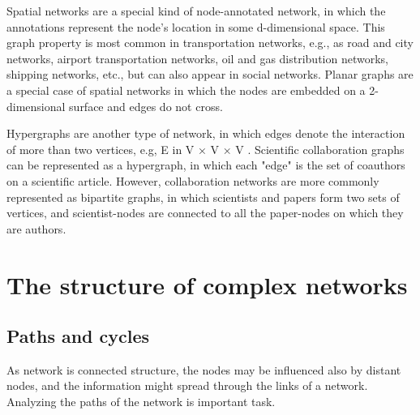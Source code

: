 Spatial networks are a special kind of node-annotated network, in which the annotations represent the node's location in some d-dimensional space. This graph property is most common in transportation networks, e.g., as road and city networks, airport transportation networks, oil and gas distribution networks, shipping networks, etc., but can also appear in social networks. Planar graphs are a special case of spatial networks in which the nodes are embedded on a 2-dimensional surface and edges do not cross. %

Hypergraphs are another type of network, in which edges denote the interaction of more than two vertices, e.g, E in V × V × V . Scientific collaboration graphs can be represented as a hypergraph, in which each "edge" is the set of coauthors on a scientific article. However, collaboration networks are more commonly represented as bipartite graphs, in which scientists and papers form two sets of vertices, and scientist-nodes are connected to all the paper-nodes on which they are authors. %


\section{The structure of complex networks}

\subsection{Paths and cycles}

As network is connected structure, the nodes may be influenced also by distant nodes, and the information might spread through the links of a network. Analyzing the paths of the network is important task.   

